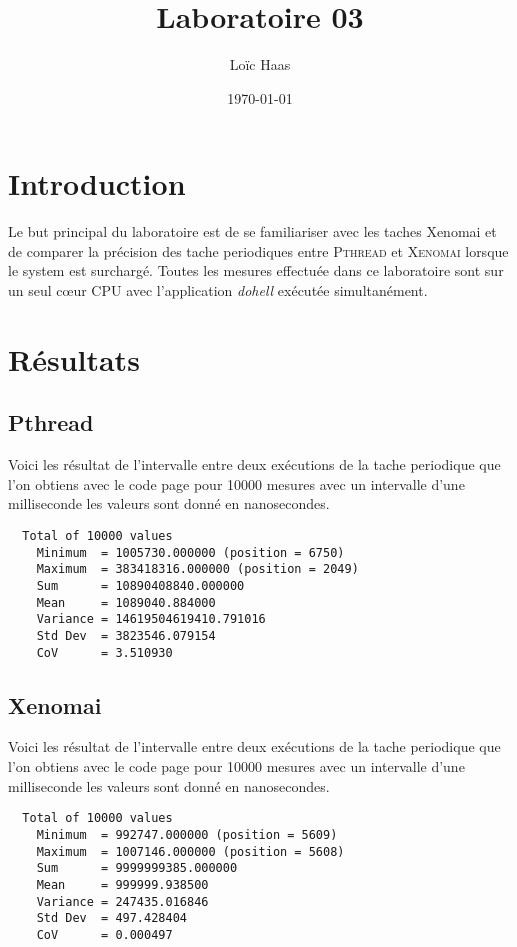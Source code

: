 \documentclass[10pt,a4paper]{article}
\author{Loïc Haas}
\title{Laboratoire 03}
\date{\today}
\begin{document}
\maketitle
\newpage
\tableofcontents
\newpage

\section{Introduction}
Le but principal du laboratoire est de se familiariser avec les taches Xenomai et de comparer la précision des tache periodiques entre \textsc{Pthread} et \textsc{Xenomai} lorsque le system est surchargé. Toutes les mesures effectuée dans ce laboratoire sont sur un seul cœur CPU avec l'application \textit{dohell} exécutée simultanément.

\section{Résultats}
\subsection{Pthread}
Voici les résultat de l'intervalle entre deux exécutions de la tache periodique que l'on obtiens avec le code page \pageref{codePthread} pour 10000 mesures avec un intervalle d'une milliseconde les valeurs sont donné en nanosecondes.\\
\begin{verbatim}
  Total of 10000 values 
    Minimum  = 1005730.000000 (position = 6750) 
    Maximum  = 383418316.000000 (position = 2049) 
    Sum      = 10890408840.000000 
    Mean     = 1089040.884000
    Variance = 14619504619410.791016 
    Std Dev  = 3823546.079154 
    CoV      = 3.510930
\end{verbatim}

\subsection{Xenomai}
Voici les résultat de l'intervalle entre deux exécutions de la tache periodique que l'on obtiens avec le code page \pageref{codeXenomai} pour 10000 mesures avec un intervalle d'une milliseconde les valeurs sont donné en nanosecondes.\\
\begin{verbatim}
  Total of 10000 values 
    Minimum  = 992747.000000 (position = 5609) 
    Maximum  = 1007146.000000 (position = 5608) 
    Sum      = 9999999385.000000 
    Mean     = 999999.938500 
    Variance = 247435.016846 
    Std Dev  = 497.428404 
    CoV      = 0.000497
\end{verbatim}
\end{document}

